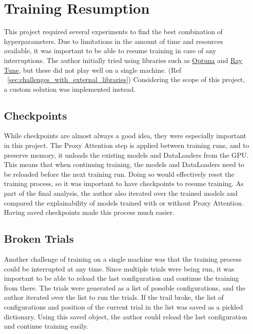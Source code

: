 \section{Training Resumption}
This project required several experiments to find the best combination of hyperparameters. Due to limitations in the amount of time and resources available, it was important to be able to resume training in case of any interruptions. The author initially tried using libraries such as \href{https://github.com/optuna/optuna}{Optuna} and \href{https://github.com/ray-project/ray}{Ray Tune}, but these did not play well on a single machine. (Ref ~\ref{sec:challenges_with_external_libraries}) Considering the scope of this project, a custom solution was implemented instead.

\subsection{Checkpoints} \label{sec:checkpoints}
While checkpoints are almost always a good idea, they were especially important in this project. The Proxy Attention step is applied between training runs, and to preserve memory, it unloads the existing models and DataLoaders from the GPU. This means that when continuing training, the models and DataLoaders need to be reloaded before the next training run. Doing so would effectively reset the training process, so it was important to have checkpoints to resume training.
As part of the final analysis, the author also iterated over the trained models and compared the explainability of models trained with or without Proxy Attention. Having saved checkpoints made this process much easier.

\subsection{Broken Trials}
Another challenge of training on a single machine was that the training process could be interrupted at any time. Since multiple trials were being run, it was important to be able to reload the last configuration and continue the training from there. The trials were generated as a list of possible configurations, and the author iterated over the list to run the trials. If the trail broke, the list of configurations and position of the current trial in the list was saved as a pickled dictionary. Using this saved object, the author could reload the last configuration and continue training easily.

